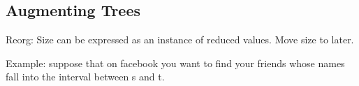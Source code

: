 \begin{chapter}
\begin{comment}
There are two problems with expectations, at least on their own.
Firstly, they tell us very little if anything about the variance.  And
secondly, as mentioned in an earlier lecture, the expectation of a
maximum can be much higher than the maximum of expectations.  The
first has implications in real time systems where we need to get
things done in time, and the second in getting efficient parallel
algorithms (e.g., span is the max span of the two parallel
calls).  Proving these high probability bounds is beyond the scope of
this course.
\end{comment}


\begin{comment}
\section*{Summary}

Earlier we showed that randomized quicksort has worst-case expected
$O(n \lg n)$ work, and this expectation was independent of the input.
That is, there is no bad input that would cause the work to be worse
than $O(n \lg n)$ all the time.  It is possible, however, (with extremely low
probability) we could be unlucky, and the random chosen pivots could
result in quicksort taking $O(n^2)$ work.

It turns out the same analysis shows that a deterministic quicksort will
on average have $O(n \lg n)$ work.  Just shuffle the input randomly,
and run the algorithm.  It behaves the same way as randomized
quicksort on that shuffled input.  Unfortunately, on some inputs
(e.g., almost sorted) the deterministic quicksort is slow, $O(n^2)$,
every time on that input.

Treaps take advantage of the same randomization idea.  But a binary
search tree is a dynamic data structure, and it cannot change the order in
which operations are applied to it. So instead of randomizing the input
order, it adds randomization to the data structure itself.
\end{comment}



\section{Augmenting Trees}

\begin{notesonly}
Reorg: Size can be expressed as an instance of reduced values.  Move
size to later.

Example: suppose that on facebook you want to find your friends
whose names fall into the interval between s and t.


\end{notesonly}
\end{chapter}
